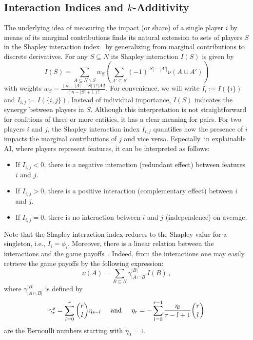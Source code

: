 \subsection{Interaction Indices and $k$-Additivity}
\label{subsec:k_additivity}

The underlying idea of measuring the impact (or share) of a single player $i$ by means of its marginal contributions finds its natural extension to sets of players $S$ in the Shapley interaction index~\citep{Murofushi1993,Grabisch1997a} by generalizing from marginal contributions to discrete derivatives.
For any $S \subseteq N$ its Shapley interaction $I(S)$ is given by
\begin{equation}
\label{eq:inter_ind}
     I(S) = \sum_{A \subseteq N\backslash S} w_S \left( \sum_{A' \subseteq S} \left(-1\right)^{\left| S \right| - |A'|}\nu(A \cup A') \right)
\end{equation}
with weights $w_S = \frac{\left(n-\left|A\right|-\left|S\right|\right)!\left|A\right|!}{\left(n-\left|S\right|+1\right)!}$.
For convenience, we will write $I_i := I(\{i\})$ and $I_{i,j} := I(\{i,j\})$.
Instead of individual importance, $I(S)$ indicates the synergy between players in $S$.
Although this interpretation is not straightforward for coalitions of three or more entities, it has a clear meaning for pairs.
For two players $i$ and $j$, the Shapley interaction index $I_{i,j}$ quantifies how the presence of $i$ impacts the marginal contributions of $j$ and vice versa.
Especially~in explainable AI, where players represent features, it can be interpreted as follows:
%
\begin{itemize}
    \item If $ I_{i,j} < 0$, there is a negative interaction (redundant effect) between features $i$ and $j$.
    \item If $I_{i,j} > 0$, there is a positive interaction (complementary effect) between $i$ and $j$.
    \item If $I_{i,j} = 0$, there is no interaction between $i$ and $j$ (independence) on average.
\end{itemize}
%
Note that the Shapley interaction index reduces to the Shapley value for a singleton, i.e., $I_i = \phi_i$.
Moreover, there is a linear relation between the interactions and the game payoffs~\citep{Grabisch1997a}. Indeed, from the interactions one may easily retrieve the game payoffs by the following expression:
\begin{equation}
\label{eq:iitomu_s}
\nu(A) = \sum_{B \subseteq N} \gamma^{\left|B \right|}_{\left| A \cap B \right|}I(B) \, ,
\end{equation}
where $\gamma^{\left|B \right|}_{\left| A \cap B \right|}$ is defined by
\begin{equation*}
\gamma_{r}^{s} = \sum_{l=0}^{r}\binom{r}{l}\eta_{s-l}
\hspace{0.5cm} \text{and} \hspace{0.5cm}
\eta_{r} = -\sum_{l=0}^{r-1}\frac{\eta_{l}}{r-l+1}\binom{r}{l}
\end{equation*}
are the Bernoulli numbers starting with $\eta_0=1$.

